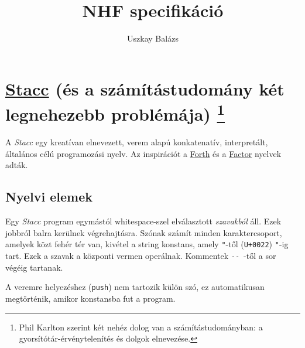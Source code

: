 \documentclass[a4paper]{article}
\author{Uszkay Balázs}
\title{NHF specifikáció}
\newcommand{\stacc}{{\it Stacc }}
\begin{document}
\maketitle
\section*{
\href{https://www.github.com/ubalu/stacc}{Stacc} (és a számítástudomány két legnehezebb problémája)
\footnote{Phil Karlton szerint két nehéz dolog van a számítástudományban: a gyorsítótár-érvénytelenítés és dolgok elnevezése.}
}

A \stacc egy kreatívan elnevezett, verem alapú konkatenatív, interpretált, általános célú programozási nyelv. Az inspirációt a \href{https://en.wikipedia.org/wiki/Forth_(programming_language)}{Forth} és a \href{https://https://factorcode.org/}{Factor} nyelvek adták.

\subsection*{Nyelvi elemek}
Egy \stacc program egymástól whitespace-szel elválasztott {\it szavakból} áll. Ezek jobbról balra kerülnek végrehajtásra. Szónak számít minden karaktercsoport, amelyek közt fehér tér van, kivétel a string konstans, amely \verb|"|-től (\verb|U+0022|) \verb|"|-ig tart. Ezek a szavak a központi vermen operálnak. Kommentek \verb|--|~-től a sor végéig tartanak.

A veremre helyezéshez (\verb|push|) nem tartozik külön szó, ez automatikusan megtörténik, amikor konstansba fut a program.
\end{document}
